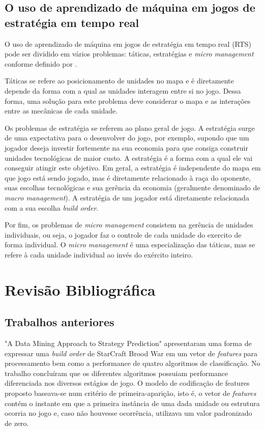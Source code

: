 		\section{O uso de aprendizado de máquina em jogos de estratégia em tempo real}
O uso de aprendizado de máquina em jogos de estratégia em tempo real (RTS) pode ser dividido em vários problemas: táticas, estratégias e \textit{micro management} conforme definido por \cite{synnaeve2011bayesian2}.

Táticas se refere ao posicionamento de unidades no mapa e é diretamente depende da forma com a qual as unidades interagem entre si no jogo. Dessa forma, uma solução para este problema deve considerar o mapa e as interações entre as mecânicas de cada unidade.

Os problemas de estratégia se referem ao plano geral de jogo. A estratégia surge de uma expectativa para o desenvolver do jogo, por exemplo, supondo que um jogador deseja investir fortemente na sua economia para que consiga construir unidades tecnológicas de maior custo. A estratégia é a forma com a qual ele vai conseguir atingir este objetivo. Em geral, a estratégia é independente do mapa em que jogo está sendo jogado, mas é diretamente relacionado à raça do oponente, suas escolhas tecnológicas e sua gerência da economia (geralmente denominado de \textit{macro management}). A estratégia de um jogador está diretamente relacionada com a sua escolha \textit{build order}.

Por fim, os problemas de \textit{micro management} consistem na gerência de unidades individuais, ou seja, o jogador faz o controle de cada unidade do exercito de forma individual. O  \textit{micro management} é uma especialização das táticas, mas se refere à cada unidade individual ao invés do exército inteiro.

	\chapter{Revisão Bibliográfica}
		\section{Trabalhos anteriores}
"A Data Mining Approach to Strategy Prediction" \cite{weber2009data} apresentaram uma forma de expressar uma \textit{build order} de StarCraft Brood War em um vetor de \textit{features} para processamento bem como a performance de quatro algoritmos de classificação. No trabalho concluíram que os diferentes algoritmos possuiam performance diferenciada nos diversos estágios de jogo. O modelo de codificação de features proposto baseava-se num critério de primeira-aparição, isto é, o vetor de \textit{features} contém o instante em que a primeira instância de uma dada unidade ou estrutura ocorria no jogo e, caso não houvesse ocorrência, utilizava um valor padronizado de zero.

